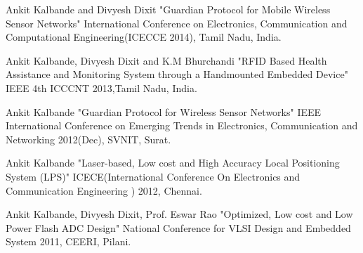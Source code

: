 \vspace{\acvSectionTopSkip}
\vspace{\acvSectionTopSkip}
\begin{cvparagraph}
      \begin{cvitems} %
        \item {Ankit Kalbande and Divyesh Dixit "Guardian Protocol for Mobile Wireless Sensor Networks" International Conference on Electronics, Communication and Computational Engineering(ICECCE 2014), Tamil Nadu, India.}
        \item {Ankit Kalbande, Divyesh Dixit and K.M Bhurchandi "RFID Based Health Assistance and Monitoring System through a Handmounted Embedded Device" IEEE 4th ICCCNT 2013,Tamil Nadu, India.}
        \item {Ankit Kalbande "Guardian Protocol for Wireless Sensor Networks" IEEE International Conference on Emerging Trends in Electronics, Communication and Networking 2012(Dec), SVNIT, Surat.}
        \item {Ankit Kalbande "Laser-based, Low cost and High Accuracy Local Positioning System (LPS)" ICECE(International Conference On Electronics and Communication Engineering ) 2012, Chennai.}
        \item {Ankit Kalbande, Divyesh Dixit, Prof. Eswar Rao "Optimized, Low cost and Low Power Flash ADC Design" National Conference for VLSI Design and Embedded System 2011, CEERI, Pilani.}
      \end{cvitems}
\end{cvparagraph}


